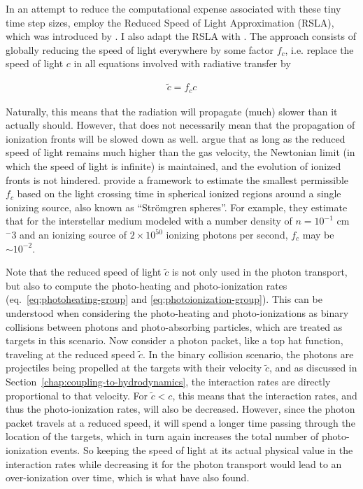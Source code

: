 In an attempt to reduce the computational expense associated with these tiny time step sizes,
\cite{ramses-rt13} employ the Reduced Speed of Light Approximation (RSLA), which was introduced by
\cite{gnedinMultidimensionalCosmologicalRadiative2001}. I also adapt the RSLA with \GEARRT. The
approach consists of globally reducing the speed of light everywhere by some factor $f_c$, i.e.
replace the speed of light $c$ in all equations involved with radiative transfer by

\begin{align}
    \tilde{c} = f_c c
\end{align}

Naturally, this means that the radiation will propagate (much) slower than it actually should.
However, that does not necessarily mean that the propagation of ionization fronts will be slowed
down as well. \cite{gnedinMultidimensionalCosmologicalRadiative2001} argue that as long as the
reduced speed of light remains much higher than the gas velocity, the Newtonian limit (in which the
speed of light is infinite) is maintained, and the evolution of ionized fronts is not hindered.
\cite{ramses-rt13} provide a framework to estimate the smallest permissible $f_c$ based on the
light crossing time in spherical ionized regions around a single ionizing source, also known as
``Str\"omgren spheres''. For example, they estimate that for the interstellar medium modeled with
a number density of $n = 10^{-1}$ cm$^-3$ and an ionizing source of $2 \times 10^{50}$ ionizing
photons per second, $f_c$ may be $\sim 10^{-2}$.

Note that the reduced speed of light $\tilde{c}$ is not only used in the photon transport, but also
to compute the photo-heating and photo-ionization rates (eq.~\ref{eq:photoheating-group} and
\ref{eq:photoionization-group}). This can be understood when considering the photo-heating and
photo-ionizations as binary collisions between photons and photo-absorbing particles, which are
treated as targets in this scenario. Now consider a photon packet, like a top hat function,
traveling at the reduced speed $\tilde{c}$. In the binary collision scenario, the photons are
projectiles being propelled at the targets with their velocity $\tilde{c}$, and as discussed in
Section~\ref{chap:coupling-to-hydrodynamics}, the interaction rates are directly proportional to
that velocity. For $\tilde{c} < c$, this means that the interaction rates, and thus the
photo-ionization rates, will also be decreased. However, since the photon packet travels at a
reduced
speed, it will spend a longer time passing through the location of the targets, which in turn again
increases the total number of photo-ionization events. So keeping the speed of light at its actual
physical value in the interaction rates while decreasing it for the photon transport would lead to
an over-ionization over time, which is what \cite{ocvirkImpactReducedSpeed2019} have also found.












